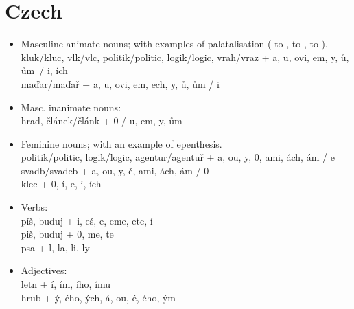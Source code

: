 \section{Czech}
\begin{flushleft}
\begin{itemize}
\item Masculine animate nouns; with examples of palatalisation ( to ,  to ,  to ).\\
kluk/kluc, vlk/vlc, politik/politic, logik/logic, vrah/vraz + a, u, ovi, em, y, ů, ům~/ i, ích\\
maďar/maďař + a, u, ovi, em, ech, y, ů, ům / i

\item Masc. inanimate nouns:\\
hrad, článek/článk + 0 / u, em, y, ům

\item Feminine nouns; with an example of epenthesis.\\
politik/politic, logik/logic, agentur/agentuř + a, ou, y, 0, ami, ách, ám / e\\
svadb/svadeb + a, ou, y, ě, ami, ách, ám / 0\\
klec + 0, í, e, i, ích\\

\item Verbs:\\
píš, buduj + i, eš, e, eme, ete, í\\
piš, buduj + 0, me, te\\
psa + l, la, li, ly\\

\item Adjectives:\\
letn + í, ím, ího, ímu\\
hrub + ý, ého, ých, á, ou, é, ého, ým\\
\end{itemize}
\end{flushleft}

